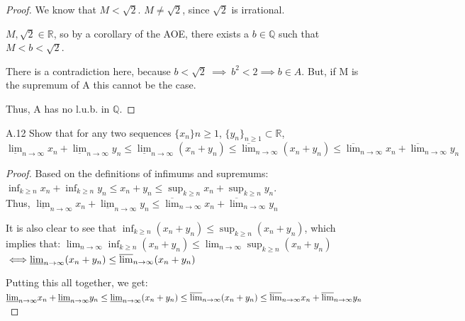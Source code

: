 \documentclass[12pt,letterpaper, onecolumn]{exam}
\newcommand{\real}{\mathbb{R}}
\newcommand{\rational}{\mathbb{Q}}
\begin{document}
\begin{questions}
\begin{solution}
\begin{proof}
        We know that $M < \sqrt{2}$. $M \neq \sqrt{2}$, since $\sqrt{2}$ is irrational. 

        $M, \sqrt{2} \in \real$, so by a corollary of the AOE, there exists a $b \in \rational$ such that $M < b < \sqrt{2}$. 

        There is a contradiction here, because $b < \sqrt{2} \: \implies \: b^2 < 2 \implies b \in A$. But, if M is the supremum of A this cannot be the case. 

        Thus, A has no l.u.b. in $\rational$.
    \end{proof}
    \end{solution}


    \question A.12 Show that for any two sequences $\{x_n\}{n\geq 1}$, $\{y_n\}_{n \geq 1} \subset \real$,
\[ \underline{\lim}_{n\to\infty}x_n + \underline{\lim}_{n\to\infty} y_n \leq \underline{\lim}_{n\to\infty}(x_n + y_n) \leq \overline{\lim}_{n \to \infty}(x_n + y_n) \leq \overline{\lim}_{n\to\infty} x_n + \overline{\lim}_{n\to\infty} y_n\]
    \begin{solution}
        \begin{proof}
        Based on the definitions of infimums and supremums: \\
        $\inf_{k \geq n} x_n + \inf_{k \geq n}y_n \leq x_n + y_n \leq  \sup_{k \geq n} x_n + \sup_{k \geq n}y_n$. \\ Thus, $\underline{\lim}_{n\to\infty}x_n + \underline{\lim}_{n\to\infty} y_n \leq \overline{\lim}_{n\to\infty} x_n + \overline{\lim}_{n\to\infty} y_n$

        

        It is also clear to see that $\inf_{k \geq n}(x_n + y_n) \leq \sup_{k \geq n}(x_n + y_n)$, which implies that: $\lim_{n\to\infty}\inf_{k \geq n}(x_n + y_n) \leq \lim_{n \to \infty}\sup_{k \geq n}(x_n + y_n)$ $\iff \\\underline{\lim}_{n\to\infty}(x_n + y_n) \leq \overline{\lim}_{n \to \infty}(x_n + y_n)$
        
        Putting this all together, we get: \\ 
        $ \underline{\lim}_{n\to\infty}x_n + \underline{\lim}_{n\to\infty} y_n \leq \underline{\lim}_{n\to\infty}(x_n + y_n) \leq \overline{\lim}_{n \to \infty}(x_n + y_n) \\ \leq \overline{\lim}_{n\to\infty} x_n + \overline{\lim}_{n\to\infty} y_n$
        \end{proof}
    \end{solution}


\end{questions}
\end{document}
